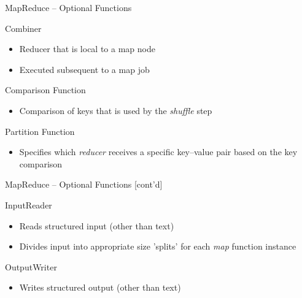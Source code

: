 \documentclass[ignorenonframetext,xcolor=x11names]{beamer}
\begin{document}
\begin{frame}[label=advanced]{MapReduce -- Optional Functions}
\begin{block}{Combiner}
\begin{itemize}
   \item Reducer that is local to a map node
   \item Executed subsequent to a map job
\end{itemize}
\end{block}

\begin{block}{Comparison Function}
\begin{itemize}
   \item Comparison of keys that is used by the \emph{shuffle} step
\end{itemize}
\end{block}

\begin{block}{Partition Function}
\begin{itemize}
   \item Specifies which \emph{reducer} receives a specific key--value pair based on the key comparison
\end{itemize}
\end{block}

\end{frame}

\begin{frame}[label=advanced]{MapReduce -- Optional Functions \small [cont'd]}
\begin{block}{InputReader}
\begin{itemize}
   \item Reads structured input (other than text)
   \item Divides input into appropriate size 'splits' for each \emph{map} function instance
\end{itemize}
\end{block}

\begin{block}{OutputWriter}
\begin{itemize}
   \item Writes structured output (other than text)
\end{itemize}
\end{block}
\end{frame}
\end{document}
